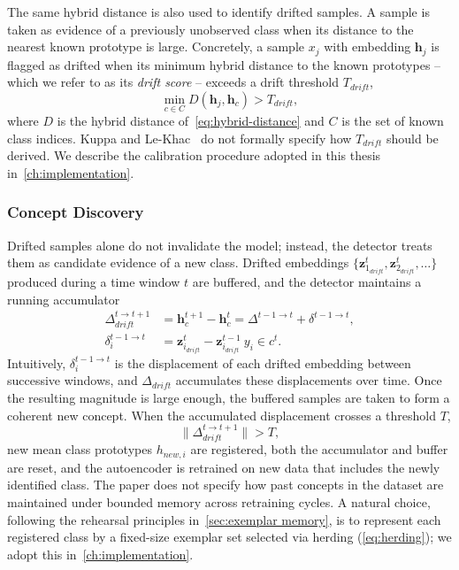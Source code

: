 The same hybrid distance is also used to identify drifted samples. A sample is taken as evidence of a previously unobserved class when its distance to the nearest known prototype is large. Concretely, a sample $x_j$ with embedding $\mathbf{h}_j$ is flagged as drifted when its minimum hybrid distance to the known prototypes -- which we refer to as its \emph{drift score} -- exceeds a drift threshold $T_{drift}$,
\begin{equation} \label{eq:drift-rule}
    \min_{c \in C} D(\mathbf{h}_j, \bm{h}_c) > T_{drift},
\end{equation}
where $D$ is the hybrid distance of~\cref{eq:hybrid-distance} and $C$ is the set of known class indices. Kuppa and Le-Khac~\cite{Kuppa_2022} do not formally specify how $T_{drift}$ should be derived. We describe the calibration procedure adopted in this thesis in~\cref{ch:implementation}.

\subsubsection{Concept Discovery}
\label{sec:concept_discovery}
Drifted samples alone do not invalidate the model; instead, the detector treats them as candidate evidence of a new class. Drifted embeddings $\{\mathbf{z}_{1_{drift}}^t, \mathbf{z}_{2_{drift}}^t, \dots\}$ produced during a time window $t$ are buffered, and the detector maintains a running accumulator
\begin{align} \label{eq:concept-accumulator}
    \Delta_{drift}^{t \to t+1} &= \bm{h}_c^{t+1} - \bm{h}_c^t = \Delta^{t-1 \to t} + \delta^{t-1 \to t},\\
    \delta_i^{t-1 \to t} &= \mathbf{z}_{i_{drift}}^t - \mathbf{z}_{i_{drift}}^{t-1}\: y_i\in c^t.
\end{align}
Intuitively, $\delta_i^{t-1 \to t}$ is the displacement of each drifted embedding between successive windows, and $\Delta_{drift}$ accumulates these displacements over time. Once the resulting magnitude is large enough, the buffered samples are taken to form a coherent new concept. When the accumulated displacement crosses a threshold $T$,
\begin{equation} \label{eq:concept-threshold}
    \|\Delta_{drift}^{t \to t+1}\| > T,
\end{equation}
new mean class prototypes $h_{new,i}$ are registered, both the accumulator and buffer are reset, and the autoencoder is retrained on new data that includes the newly identified class. The paper does not specify how past concepts in the dataset are maintained under bounded memory across retraining cycles. A natural choice, following the rehearsal principles in~\cref{sec:exemplar memory}, is to represent each registered class by a fixed-size exemplar set selected via herding (\cref{eq:herding}); we adopt this in~\cref{ch:implementation}.

